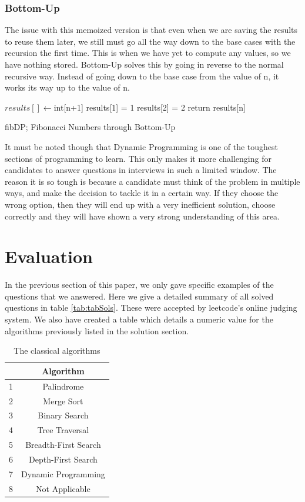\documentclass[10pt,twocolumn]{IEEEtran}
\begin{document}
	
	\subsubsection{Bottom-Up}
	The issue with this memoized version is that even when we are saving the results to reuse them later, we still must go all the way down to the base cases with the recursion the first time. This is when we have yet to compute any values, so we have nothing stored.
	Bottom-Up solves this by going in reverse to the normal recursive way. Instead of going down to the base case from the value of n, it works its way up to the value of n.   
\IncMargin{1em}
	\begin{algorithm}
		$results[] \leftarrow $int[n+1]\;
		results[1] = 1\;
		results[2] = 2\;
		return results[n]\;		
		\caption{fibDP; Fibonacci Numbers through Bottom-Up}
	\end{algorithm}\DecMargin{1em}
\par It must be noted though that Dynamic Programming is one of the toughest sections of programming to learn. This only makes it more challenging for candidates to answer questions in interviews in such a limited window. The reason it is so tough is because a candidate must think of the problem in multiple ways, and make the decision to tackle it in a certain way. If they choose the wrong option, then they will end up with a very inefficient solution, choose correctly and they will have shown a very strong understanding of this area.
\section{Evaluation}
In the previous section of this paper, we only gave specific examples of the questions that we answered. Here we give a detailed summary of all solved questions in table \ref{tab:tabSols}. These were accepted by leetcode's online judging system. 
We also have created a table which details a numeric value for the algorithms previously listed in the solution section.
\begin{table}[t]
\centering
	\begin{tabular}{| c | c |} \hline
		    &Algorithm \\ \hline
		1 & Palindrome\\ \hline
		2 & Merge Sort\\ \hline
		3 & Binary Search\\ \hline
		4 & Tree Traversal \\ \hline
		5 & Breadth-First Search\\ \hline
		6 & Depth-First Search\\ \hline
		7 & Dynamic Programming\\ \hline
		8 & Not Applicable\\ \hline
	\end{tabular}
	\caption{The classical algorithms}
	\label{tab:classicalAlgos}
\end{table}
\end{document}
